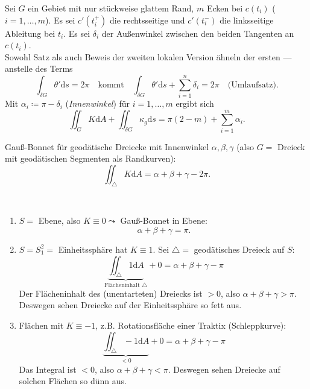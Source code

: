 Sei \( G \) ein Gebiet mit nur stückweise glattem Rand, \( m \) Ecken bei \( c(t_i) \) (\( i = 1,\dots,m \)). Es sei \( c'(t_i^+) \) die rechtsseitige und \( c'(t_i^-) \) die linksseitige Ableitung bei \( t_i \). Es sei \( \delta_i \) der Außenwinkel zwischen den beiden Tangenten an \( c(t_i) \). \\
Sowohl Satz als auch Beweis der zweiten lokalen Version ähneln der ersten --- anstelle des Terms
\begin{equation*}
  \int_{\delta G}\theta'\text{d}s = 2\pi \quad \text{kommt} \quad  \int_{\delta G}\theta'\text{d}s + \sum_{i = 1}^n\delta_i = 2\pi \quad \text{(Umlaufsatz).}
\end{equation*}
Mit \( \alpha_i \coloneqq \pi - \delta_i \) (\emph{Innenwinkel}) für \( i = 1,\dots,m \) ergibt sich
\begin{equation*}
  \iint_G K\text{d}A + \iint_{\delta G}\kappa_g\text{d}s = \pi(2-m) + \sum_{i = 1}^m\alpha_i\text{.}
\end{equation*}

\begin{remark}[Spezialfall]
  Gauß-Bonnet für geodätische Dreiecke mit Innenwinkel \( \alpha,\beta,\gamma \) (also \( G = \) Dreieck mit geodätischen Segmenten als Randkurven):
  \begin{equation*}
    \iint_\triangle K\text{d}A = \alpha + \beta + \gamma -2\pi\text{.}
  \end{equation*}
\end{remark}

\begin{remark}
  \
  \begin{enumerate}

    \item \( S = \) Ebene, also \( K \equiv 0 \leadsto \) Gauß-Bonnet in Ebene:
    \begin{equation*}
      \alpha + \beta + \gamma = \pi\text{.}
    \end{equation*}

    \item \( S = S_1^2 =  \) Einheitssphäre hat \( K \equiv 1 \). Sei \( \triangle = \) geodätisches Dreieck auf \( S \):
    \begin{equation*}
      \underbrace{\iint_\triangle 1\text{d}A}_{\text{Flächeninhalt } \triangle} + 0 = \alpha + \beta + \gamma - \pi
    \end{equation*}
    Der Flächeninhalt des (unentarteten) Dreiecks ist \( > 0 \), also \( \alpha + \beta + \gamma > \pi \). Deswegen sehen Dreiecke auf der Einheitssphäre so fett aus.

    \item Flächen mit \( K \equiv -1 \), z.B. Rotationsfläche einer Traktix (Schleppkurve):
    \begin{equation*}
      \underbrace{\iint_\triangle -1\text{d}A}_{< 0} + 0 = \alpha + \beta + \gamma - \pi
    \end{equation*}
    Das Integral ist \( < 0 \), also \( \alpha + \beta + \gamma < \pi \). Deswegen sehen Dreiecke auf solchen Flächen so dünn aus.
  \end{enumerate}
\end{remark}


